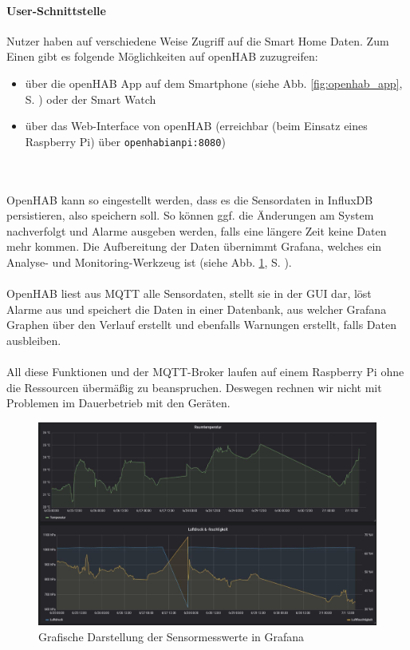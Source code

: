 \documentclass[a4paper,10pt,twocolumn]{article}
\begin{document}
\paragraph{User-Schnittstelle}
Nutzer haben auf verschiedene Weise Zugriff auf die Smart Home Daten. Zum Einen gibt es folgende Möglichkeiten auf openHAB zuzugreifen: 
\begin{itemize}
    \item über die openHAB App auf dem Smartphone (siehe Abb. \ref{fig:openhab_app}, S. \pageref{fig:openhab_app}) oder der Smart Watch
    \item über das Web-Interface von openHAB (erreichbar (beim Einsatz eines Raspberry Pi) über \texttt{openhabianpi:8080})
\end{itemize}\\\\
OpenHAB kann so eingestellt werden, dass es die Sensordaten in InfluxDB persistieren, also speichern soll. So können ggf. die Änderungen am System nachverfolgt und Alarme ausgeben werden, falls eine längere Zeit keine Daten mehr kommen. Die Aufbereitung der Daten übernimmt Grafana, welches ein Analyse- und Monitoring-Werkzeug ist (siehe Abb. \ref{fig:grafana}, S. \pageref{fig:grafana}).\\\\
OpenHAB liest aus MQTT alle Sensordaten, stellt sie in der GUI dar, löst Alarme aus und speichert die Daten in einer Datenbank, aus welcher Grafana Graphen über den Verlauf erstellt und ebenfalls Warnungen erstellt, falls Daten ausbleiben.\\\\
All diese Funktionen und der \ac{MQTT}-Broker laufen auf einem Raspberry Pi ohne die Ressourcen übermäßig zu beanspruchen. Deswegen rechnen wir nicht mit Problemen im Dauerbetrieb mit den Geräten.

\begin{figure}[htb!]
\centering
\includegraphics[width = (\textwidth)/2]{images/grafana.png}
\caption{Grafische Darstellung der Sensormesswerte in Grafana}
\label{fig:grafana}
\end{figure}
\end{document}
